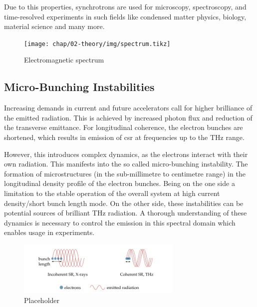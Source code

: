 Due to this properties, synchrotrons are used for microscopy, spectroscopy, and time-resolved experiments in such fields like condensed matter physics, biology, material science and many more.
\begin{figure}[H]
	\centering
	\texttt{[image: chap/02-theory/img/spectrum.tikz]}
	\caption{Electromagnetic spectrum} %
	\label{fig:spectrum}
\end{figure}

\subsection{Micro-Bunching Instabilities}
Increasing demands in current and future accelerators call for higher brilliance of the emitted radiation.
This is achieved by increased photon flux and reduction of the transverse emittance.
For longitudinal coherence, the electron bunches are shortened, which results in emission of \gls{csr} at frequencies up to the THz range.

However, this introduces complex dynamics, as the electrons interact with their own radiation.
This manifests into the so called micro-bunching instability.
The formation of microstructures (in the sub-millimetre to centimetre range) in the longitudinal density profile of the electron bunches.
Being on the one side a limitation to the stable operation of the overall system at high current density/short bunch length mode.
On the other side, these instabilities can be potential sources of brilliant THz radiation. %
A thorough understanding of these dynamics is necessary to control the emission in this spectral domain which enables usage in experiments. \cite{rota2018,brosi}

\begin{figure}[H]
	\centering
	\includegraphics[width = 0.7\textwidth]{chap/02-theory/img/csr2.png}
	\caption{Placeholder \cite{rota2018}}
	\label{fig:csr}
\end{figure}

